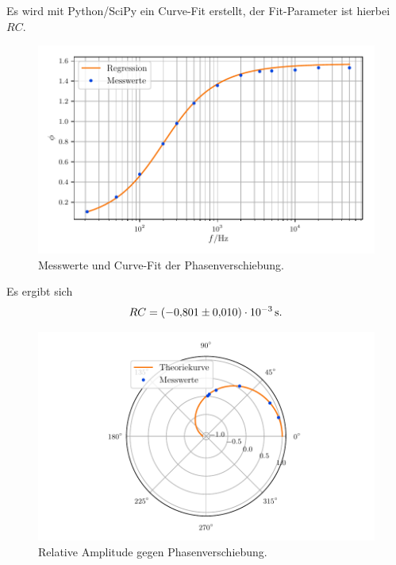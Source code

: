 Es wird mit Python/SciPy ein Curve-Fit erstellt, der Fit-Parameter ist hierbei $RC$.
\begin{figure}[H]
    \centering
    \includegraphics[width=\textwidth]{build/messung3.pdf}
    \caption{Messwerte und Curve-Fit der Phasenverschiebung.}
    \label{fig:plot3}
\end{figure}
\noindent
Es ergibt sich
\begin{equation}
    RC = \SI{-0.801\pm0.010e-3}{\second}.
\end{equation}
\noindent
\begin{figure}[H]
    \centering
    \includegraphics[width=\textwidth]{build/polar.pdf}
    \caption{Relative Amplitude gegen Phasenverschiebung.}
    \label{fig:polar}
\end{figure}
%
